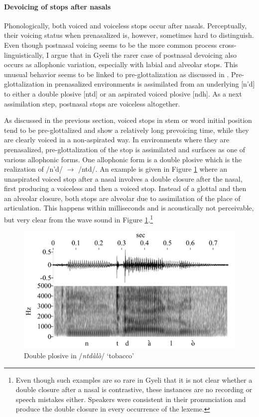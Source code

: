 \iffalse
\paragraph{Devoicing of stops after nasals}

Phonologically, both voiced and voiceless stops occur after nasals. Perceptually, their voicing status when prenasalized is, however, sometimes hard to distinguish. Even though postnasal voicing seems to be the more common process cross-linguistically, I argue that in Gyeli the rarer case of postnasal devoicing also occurs as allophonic variation, especially with labial and alveolar stops. This unusual behavior seems to be linked to pre-glottalization as discussed in . Pre-glottalization in prenasalized environments is assimilated from an underlying [n'd] to either a double plosive [ntd] or an aspirated voiced plosive [ndh]. As a next assimilation step, postnasal stops are voiceless altogether. 

As discussed in the previous section, voiced stops in stem or word initial position tend to be pre-glottalized and show a relatively long prevoicing time, while they are clearly voiced in a non-aspirated way. In environments where they are prenasalized, pre-glottalization of the stop is assimilated and surfaces as one of various allophonic forms. One allophonic form is a double plosive which is the realization of /n'd/ $\rightarrow$ /ntd/. An example is given in Figure \ref{Fig:ntdalo} where an unaspirated voiced stop after a nasal involves a double closure after the nasal, first producing a voiceless and then a voiced stop. Instead of a glottal and then an alveolar closure, both stops are alveolar due to assimilation of the place of articulation. This happens within milliseconds and is acoustically not perceivable, but very clear from the wave sound in Figure \ref{Fig:ntdalo}.\footnote{Even though such examples are so rare in Gyeli that it is not clear whether a double closure after a nasal is contrastive, these instances are no recording or speech mistakes either. Speakers were consistent in their pronunciation and produce the double closure in every occurrence of the lexeme.}

\begin{figure} 
\centering
\includegraphics[width=\textwidth]{figures/ntdalo-mini}
\caption{Double plosive in /{\itshape ntdàlò}/ `tobacco'}
\label{Fig:ntdalo}
\end{figure}

